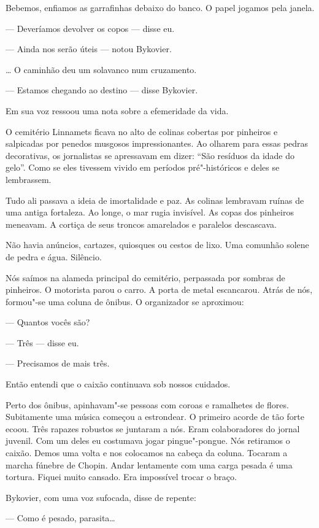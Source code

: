 Bebemos, enfiamos as garrafinhas debaixo do banco. O papel jogamos pela
janela.

--- Deveríamos devolver os copos --- disse eu.

--- Ainda nos serão úteis --- notou Bykovier.

\ldots{} O caminhão deu um solavanco num cruzamento.

--- Estamos chegando ao destino --- disse Bykovier.

Em sua voz ressoou uma nota sobre a efemeridade da vida.

O cemitério Linnamets ficava no alto de colinas cobertas por pinheiros e
salpicadas por penedos musgosos impressionantes. Ao olharem para essas
pedras decorativas, os jornalistas se apressavam em dizer: ``São
resíduos da idade do gelo''. Como se eles tivessem vivido em períodos
pré"-históricos e deles se lembrassem.

Tudo ali passava a ideia de imortalidade e paz. As colinas lembravam
ruínas de uma antiga fortaleza. Ao longe, o mar rugia invisível. As
copas dos pinheiros meneavam. A cortiça de seus troncos amarelados e
paralelos descascava.

Não havia anúncios, cartazes, quiosques ou cestos de lixo. Uma comunhão
solene de pedra e água. Silêncio.

Nós saímos na alameda principal do cemitério, perpassada por sombras de
pinheiros. O motorista parou o carro. A porta de metal escancarou. Atrás
de nós, formou"-se uma coluna de ônibus. O organizador se aproximou:

--- Quantos vocês são?

--- Três --- disse eu.

--- Precisamos de mais três.

Então entendi que o caixão continuava sob nossos cuidados.

Perto dos ônibus, apinhavam"-se pessoas com coroas e ramalhetes de
flores. Subitamente uma música começou a estrondear. O primeiro acorde
de tão forte ecoou. Três rapazes robustos se juntaram a nós. Eram
colaboradores do jornal juvenil. Com um deles eu costumava jogar
pingue"-pongue. Nós retiramos o caixão. Demos uma volta e nos colocamos
na cabeça da coluna. Tocaram a marcha fúnebre de Chopin. Andar
lentamente com uma carga pesada é uma tortura. Fiquei muito cansado. Era
impossível trocar o braço.

Bykovier, com uma voz sufocada, disse de repente:

--- Como é pesado, parasita\ldots{}

